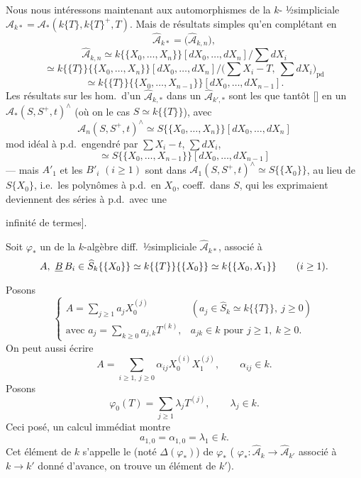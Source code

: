 \documentclass[11pt,a4paper]{article}
\begin{document}
Nous nous intéressons maintenant aux automorphismes de la $k$-  ½simpliciale $\mathcal{A}_{k*}=\mathcal{A}_{*}(k\{T\},k\{T\}^{+},T)$. Mais \ill{} de résultats simples qu'en complétant en
\[
\widehat{\mathcal{A}}_{k*}=\bigl(\widehat{\mathcal{A}}_{k,n}\bigr),
\]
\[
\widehat{\mathcal{A}}_{k,n}\simeq k\{\{X_{0},\ldots,X_{n}\}\}[dX_{0},\ldots,dX_{n}]\big/\textstyle\sum dX_{i}
\]
\[
\simeq k\{\{T\}\}\{\{X_{0},\ldots,X_{n}\}\}[dX_{0},\ldots,dX_{n}]\big/\bigl(\textstyle\sum X_{i}-T,\ \sum dX_{i}\bigr)_{\mathrm{pd}}
\]
\[
\simeq k\{\{T\}\}\{\{X_{0},\ldots,X_{n-1}\}\}[dX_{0},\ldots,dX_{n-1}].
\]
Les résultats sur les hom.\ d'un $\widehat{\mathcal{A}}_{k,*}$ dans un $\widehat{\mathcal{A}}_{k',*}$ sont les  que tantôt [\ill{}]  en un $\mathcal{A}_{*}(S,S^{+},t)^{\wedge}$ (où on \struck{\ill{}} \ill{} le cas $S\simeq k\{\{T\}\}$), avec
\[
\mathcal{A}_{n}(S,S^{+},t)^{\wedge}\simeq S\{\{X_{0},\ldots,X_{n}\}\}[dX_{0},\ldots,dX_{n}]
\]
mod idéal à p.d.\ engendré par $\sum X_{i}-t$, $\sum dX_{i}$,
\[
\simeq S\{\{X_{0},\ldots,X_{n-1}\}\}[dX_{0},\ldots,dX_{n-1}]
\]
— mais $A'_{1}$ et les $B'_{i}$ $(i\geq 1)$ sont dans $\mathcal{A}_{1}(S,S^{+},t)^{\wedge}\simeq S\{\{X_{0}\}\}$, au lieu de $S\{X_{0}\}$, i.e.\ les polynômes à p.d.\ en $X_{0}$, coeff.\ dans $S$, qui les exprimaient deviennent des séries à p.d.\ avec une

infinité de termes].

Soit $\varphi_{*}$ un   de la $k$-algèbre diff.\ ½simpliciale $\widehat{\mathcal{A}}_{k*}$, associé à
\[
A,\ \struck{B}\,B_{i}\in\widehat{S}_{k}\{\{X_{0}\}\}\simeq k\{\{T\}\}\{\{X_{0}\}\}\simeq k\{\{X_{0},X_{1}\}\}\qquad (i\geq 1).
\]
Posons
\[
\begin{cases}
A=\sum\limits_{j\geq 1}a_{j}X_{0}^{(j)} & (a_{j}\in\widehat{S}_{k}\simeq k\{\{T\}\},\ j\geq 0)\\
\text{avec } a_{j}=\sum\limits_{k\geq 0}a_{j,k}T^{(k)}, & a_{jk}\in k \text{ pour } j\geq 1,\ k\geq 0.
\end{cases}
\]
On peut aussi écrire
\[
A=\sum_{i\geq 1,\ j\geq 0}\alpha_{ij}X_{0}^{(i)}X_{1}^{(j)},\qquad \alpha_{ij}\in k.
\]
Posons
\[
\varphi_{0}(T)=\sum_{j\geq 1}\lambda_{j}T^{(j)},\qquad \lambda_{j}\in k.
\]
Ceci posé, un calcul immédiat montre
\[
\boxed{a_{1,0}=\alpha_{1,0}=\lambda_{1}}\in k.
\]
Cet élément de $k$ s'appelle le    (noté $\Delta(\varphi_{*})$) de $\varphi_{*}$ ( $\varphi_{*}\colon\widehat{\mathcal{A}}_{k}\to\widehat{\mathcal{A}}_{k'}$ associé à $k\to k'$ donné d'avance, on trouve un élément de $k'$).
\end{document}
